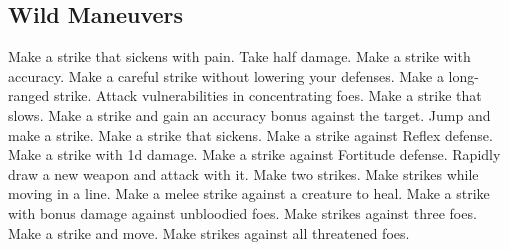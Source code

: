 \small
\subsection{Wild Maneuvers}\label{Wild Maneuvers}
\begin{spelllist}
 Make a strike that sickens with pain.
 Take half damage.
 Make a strike with  accuracy.
 Make a careful strike without lowering your defenses.
 Make a long-ranged strike.
 Attack vulnerabilities in concentrating foes.
 Make a strike that slows.
 Make a strike and gain an accuracy bonus against the target.
 Jump and make a strike.
 Make a strike that sickens.
 Make a strike against Reflex defense.
 Make a strike with \plus1d damage.
 Make a strike against Fortitude defense.
 Rapidly draw a new weapon and attack with it.
 Make two strikes.
 Make strikes while moving in a line.
 Make a melee strike against a creature to heal.
 Make a strike with bonus damage against unbloodied foes.
 Make strikes against three foes.
 Make a strike and move.
 Make strikes against all threatened foes.
\end{spelllist}
